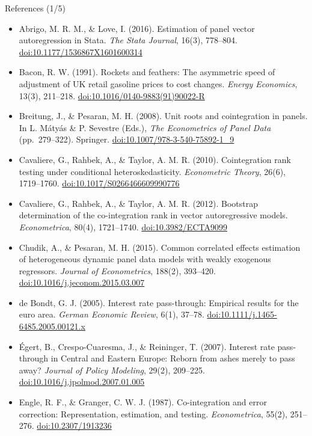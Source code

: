 \begin{frame}{References (1/5)}
\itemsize{\tiny}
\begin{itemize}
    \item Abrigo, M. R. M., \& Love, I. (2016). Estimation of panel vector autoregression in Stata. \textit{The Stata Journal}, 16(3), 778--804. \href{https://doi.org/10.1177/1536867X1601600314}{doi:10.1177/1536867X1601600314}
    \item Bacon, R. W. (1991). Rockets and feathers: The asymmetric speed of adjustment of UK retail gasoline prices to cost changes. \textit{Energy Economics}, 13(3), 211--218. \href{https://doi.org/10.1016/0140-9883(91)90022-R}{doi:10.1016/0140-9883(91)90022-R}
    \item Breitung, J., \& Pesaran, M. H. (2008). Unit roots and cointegration in panels. In L. Mátyás \& P. Sevestre (Eds.), \textit{The Econometrics of Panel Data} (pp.\ 279--322). Springer. \href{https://doi.org/10.1007/978-3-540-75892-1_9}{doi:10.1007/978-3-540-75892-1\_9}
    \item Cavaliere, G., Rahbek, A., \& Taylor, A. M. R. (2010). Cointegration rank testing under conditional heteroskedasticity. \textit{Econometric Theory}, 26(6), 1719--1760. \href{https://doi.org/10.1017/S0266466609990776}{doi:10.1017/S0266466609990776}
    \item Cavaliere, G., Rahbek, A., \& Taylor, A. M. R. (2012). Bootstrap determination of the co-integration rank in vector autoregressive models. \textit{Econometrica}, 80(4), 1721--1740. \href{https://doi.org/10.3982/ECTA9099}{doi:10.3982/ECTA9099}
    \item Chudik, A., \& Pesaran, M. H. (2015). Common correlated effects estimation of heterogeneous dynamic panel data models with weakly exogenous regressors. \textit{Journal of Econometrics}, 188(2), 393--420. \href{https://doi.org/10.1016/j.jeconom.2015.03.007}{doi:10.1016/j.jeconom.2015.03.007}
    \item de Bondt, G. J. (2005). Interest rate pass-through: Empirical results for the euro area. \textit{German Economic Review}, 6(1), 37--78. \href{https://doi.org/10.1111/j.1465-6485.2005.00121.x}{doi:10.1111/j.1465-6485.2005.00121.x}
    \item Égert, B., Crespo-Cuaresma, J., \& Reininger, T. (2007). Interest rate pass-through in Central and Eastern Europe: Reborn from ashes merely to pass away? \textit{Journal of Policy Modeling}, 29(2), 209--225. \href{https://doi.org/10.1016/j.jpolmod.2007.01.005}{doi:10.1016/j.jpolmod.2007.01.005}
    \item Engle, R. F., \& Granger, C. W. J. (1987). Co-integration and error correction: Representation, estimation, and testing. \textit{Econometrica}, 55(2), 251--276. \href{https://doi.org/10.2307/1913236}{doi:10.2307/1913236}

\end{itemize}
\end{frame}
